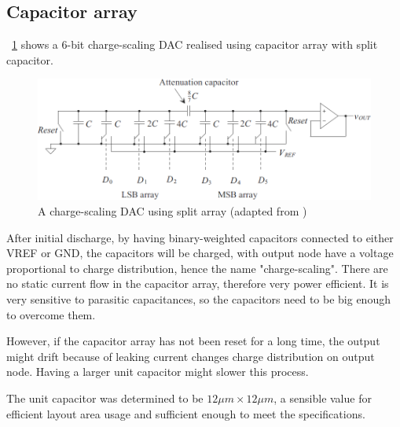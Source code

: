 \documentclass[journal]{IEEEtran}
\newcommand{\fref}[1]{\figurename~\ref{#1}}
\begin{document}
\subsection{Capacitor array}

\fref{fig_cap_split} shows a 6-bit charge-scaling DAC realised using capacitor array with split capacitor.


\begin{figure}[!t]
	\centering
	\includegraphics[width=\columnwidth]{cap_split}
	\caption{A charge-scaling DAC using split array (adapted from \cite{cap_dac})}
	\label{fig_cap_split}
\end{figure}

After initial discharge, by having binary-weighted capacitors connected to either VREF or GND, the capacitors will be charged, with output node have a voltage proportional to charge distribution, hence the name "charge-scaling". There are no static current flow in the capacitor array, therefore very power efficient. It is very sensitive to parasitic capacitances, so the capacitors need to be big enough to overcome them.

However, if the capacitor array has not been reset for a long time, the output might drift because of leaking current changes charge distribution on output node. Having a larger unit capacitor might slower this process.

The unit capacitor was determined to be $12 \mu m \times 12 \mu m$, a sensible value for efficient layout area usage and sufficient enough to meet the specifications.


\end{document}
